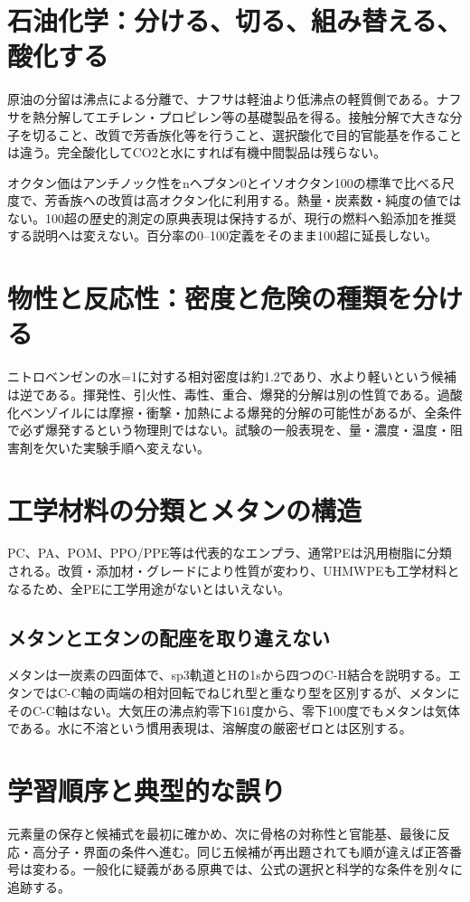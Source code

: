 \section{石油化学：分ける、切る、組み替える、酸化する}
\label{theory:organic:petroleum}
原油の分留は沸点による分離で、ナフサは軽油より低沸点の軽質側である。ナフサを熱分解してエチレン・プロピレン等の基礎製品を得る\cite{organic_jpca,organic_jpca_dict}。接触分解で大きな分子を切ること、改質で芳香族化等を行うこと、選択酸化で目的官能基を作ることは違う。完全酸化してCO2と水にすれば有機中間製品は残らない。

オクタン価はアンチノック性をnヘプタン0とイソオクタン100の標準で比べる尺度で、芳香族への改質は高オクタン化に利用する\cite{organic_gasoline}。熱量・炭素数・純度の値ではない。100超の歴史的測定の原典表現は保持するが、現行の燃料へ鉛添加を推奨する説明へは変えない。百分率の0–100定義をそのまま100超に延長しない。

\section{物性と反応性：密度と危険の種類を分ける}
\label{theory:organic:properties}
ニトロベンゼンの水=1に対する相対密度は約1.2であり、水より軽いという候補は逆である\cite{organic_nitro}。揮発性、引火性、毒性、重合、爆発的分解は別の性質である。過酸化ベンゾイルには摩擦・衝撃・加熱による爆発的分解の可能性があるが、全条件で必ず爆発するという物理則ではない\cite{organic_peroxide}。試験の一般表現を、量・濃度・温度・阻害剤を欠いた実験手順へ変えない。

\section{工学材料の分類とメタンの構造}
\label{theory:organic:engineering}
PC、PA、POM、PPO/PPE等は代表的なエンプラ、通常PEは汎用樹脂に分類される。改質・添加材・グレードにより性質が変わり、UHMWPEも工学材料となるため、全PEに工学用途がないとはいえない\cite{organic_enpla}。

\subsection{メタンとエタンの配座を取り違えない}
\label{theory:organic:methane}
メタンは一炭素の四面体で、sp3軌道とHの1sから四つのC-H結合を説明する。エタンではC-C軸の両端の相対回転でねじれ型と重なり型を区別するが、メタンにそのC-C軸はない。大気圧の沸点約零下161度から、零下100度でもメタンは気体である\cite{organic_methane}。水に不溶という慣用表現は、溶解度の厳密ゼロとは区別する。

\section{学習順序と典型的な誤り}
元素量の保存と候補式を最初に確かめ、次に骨格の対称性と官能基、最後に反応・高分子・界面の条件へ進む。同じ五候補が再出題されても順が違えば正答番号は変わる。一般化に疑義がある原典では、公式の選択と科学的な条件を別々に追跡する。



